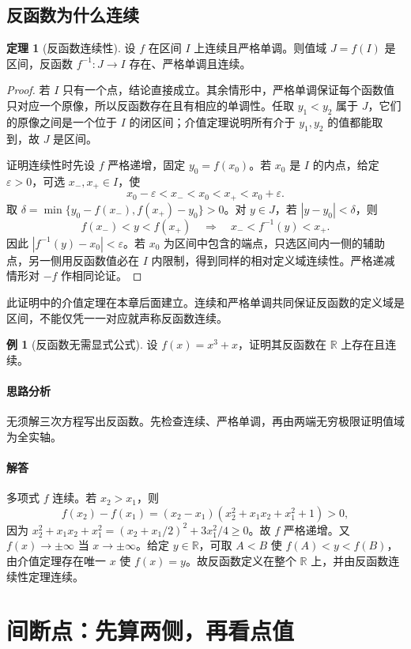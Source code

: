 \documentclass[UTF8,fontset=fandol,12pt,oneside,openany]{ctexrep}
\newcommand{\R}{\mathbb R}
\theoremstyle{definition}
\newtheorem{theorem}{定理}[chapter]
\newtheorem{example}{例}[chapter]
\begin{document}
\subsection{反函数为什么连续}
\label{lec:04:inverse}
\begin{theorem}[反函数连续性]
设 $f$ 在区间 $I$ 上连续且严格单调。则值域 $J=f(I)$ 是区间，反函数 $f^{-1}:J\to I$ 存在、严格单调且连续。
\end{theorem}
\begin{proof}
若 $I$ 只有一个点，结论直接成立。其余情形中，严格单调保证每个函数值只对应一个原像，所以反函数存在且有相应的单调性。任取 $y_1<y_2$ 属于 $J$，它们的原像之间是一个位于 $I$ 的闭区间；介值定理说明所有介于 $y_1,y_2$ 的值都能取到，故 $J$ 是区间。

证明连续性时先设 $f$ 严格递增，固定 $y_0=f(x_0)$。若 $x_0$ 是 $I$ 的内点，给定 $\varepsilon>0$，可选 $x_-,x_+\in I$，使
\[
 x_0-\varepsilon<x_-<x_0<x_+<x_0+\varepsilon.
\]
取 $\delta=\min\{y_0-f(x_-),f(x_+)-y_0\}>0$。对 $y\in J$，若 $|y-y_0|<\delta$，则
\[
 f(x_-)<y<f(x_+)\quad\Longrightarrow\quad
 x_-<f^{-1}(y)<x_+.
\]
因此 $|f^{-1}(y)-x_0|<\varepsilon$。若 $x_0$ 为区间中包含的端点，只选区间内一侧的辅助点，另一侧用反函数值必在 $I$ 内限制，得到同样的相对定义域连续性。严格递减情形对 $-f$ 作相同论证。
\end{proof}
此证明中的介值定理在本章后面建立。连续和严格单调共同保证反函数的定义域是区间，不能仅凭一一对应就声称反函数连续。

\begin{example}[反函数无需显式公式]
设 $f(x)=x^3+x$，证明其反函数在 $\R$ 上存在且连续。
\end{example}
\paragraph{思路分析}
无须解三次方程写出反函数。先检查连续、严格单调，再由两端无穷极限证明值域为全实轴。
\paragraph{解答}
多项式 $f$ 连续。若 $x_2>x_1$，则
\[
 f(x_2)-f(x_1)
 =(x_2-x_1)(x_2^2+x_1x_2+x_1^2+1)>0,
\]
因为 $x_2^2+x_1x_2+x_1^2=(x_2+x_1/2)^2+3x_1^2/4\ge0$。故 $f$ 严格递增。又 $f(x)\to\pm\infty$ 当 $x\to\pm\infty$。给定 $y\in\R$，可取 $A<B$ 使 $f(A)<y<f(B)$，由介值定理存在唯一 $x$ 使 $f(x)=y$。故反函数定义在整个 $\R$ 上，并由反函数连续性定理连续。

\section{间断点：先算两侧，再看点值}
\label{lec:04:discontinuity}
\end{document}
